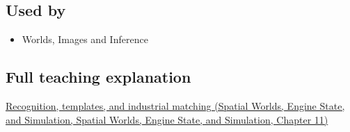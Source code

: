 \subsection{Used by}\label{appendix-5fb4af80d1c7-used-by}

\begin{itemize}
\tightlist
\item
  {Worlds, Images and Inference}
\end{itemize}

\subsection{Full teaching explanation}\label{appendix-5fb4af80d1c7-full-teaching-explanation}

\href{../05-Spatial-Worlds-Engine-State-and-Simulation/main.pdf\#nameddest=04-visual-computing-ii-ch030-recognition-templates-and-industrial-matching}{Recognition, templates, and industrial matching (Spatial Worlds, Engine State, and Simulation, Spatial Worlds, Engine State, and Simulation, Chapter 11)}
